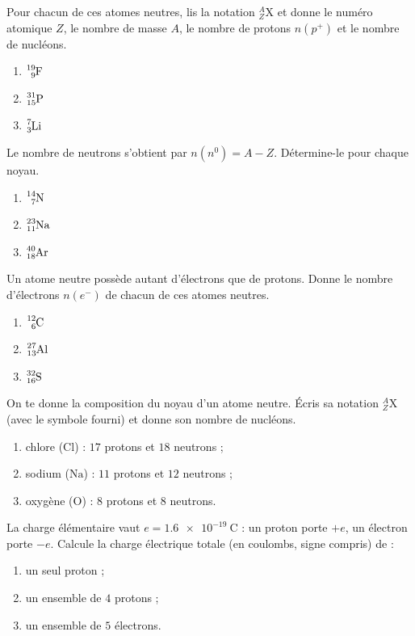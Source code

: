 \documentclass[11pt,a4paper]{article}
\begin{document}
\begin{exo}
Pour chacun de ces atomes neutres, lis la notation $^{A}_{Z}\mathrm{X}$ et donne le numéro atomique
$Z$, le nombre de masse $A$, le nombre de protons $n(p^+)$ et le nombre de nucléons.
\begin{enumerate}[label=\alph*)]
  \item $\ce{^{19}_{9}F}$
  \item $\ce{^{31}_{15}P}$
  \item $\ce{^{7}_{3}Li}$
\end{enumerate}
\end{exo}

\begin{exo}
Le nombre de neutrons s'obtient par $n(n^0) = A - Z$. Détermine-le pour chaque noyau.
\begin{enumerate}[label=\alph*)]
  \item $\ce{^{14}_{7}N}$
  \item $\ce{^{23}_{11}Na}$
  \item $\ce{^{40}_{18}Ar}$
\end{enumerate}
\end{exo}

\begin{exo}
Un atome neutre possède autant d'électrons que de protons. Donne le nombre d'électrons $n(e^-)$ de
chacun de ces atomes neutres.
\begin{enumerate}[label=\alph*)]
  \item $\ce{^{12}_{6}C}$
  \item $\ce{^{27}_{13}Al}$
  \item $\ce{^{32}_{16}S}$
\end{enumerate}
\end{exo}

\begin{exo}
On te donne la composition du noyau d'un atome neutre. Écris sa notation $^{A}_{Z}\mathrm{X}$ (avec le
symbole fourni) et donne son nombre de nucléons.
\begin{enumerate}[label=\alph*)]
  \item chlore ($\mathrm{Cl}$) : $17$ protons et $18$ neutrons ;
  \item sodium ($\mathrm{Na}$) : $11$ protons et $12$ neutrons ;
  \item oxygène ($\mathrm{O}$) : $8$ protons et $8$ neutrons.
\end{enumerate}
\end{exo}

\begin{exo}
La charge élémentaire vaut $e = \SI{1,6e-19}{\coulomb}$ : un proton porte $+e$, un électron porte
$-e$. Calcule la charge électrique totale (en coulombs, signe compris) de :
\begin{enumerate}[label=\alph*)]
  \item un seul proton ;
  \item un ensemble de $4$ protons ;
  \item un ensemble de $5$ électrons.
\end{enumerate}
\end{exo}
\end{document}
